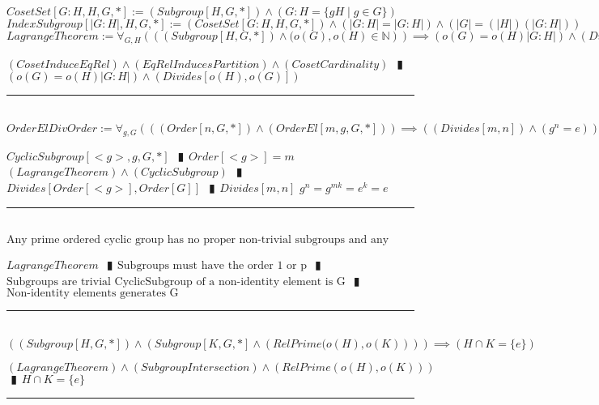 \documentclass{book}
\newcommand{\abr}{:=}
\newcommand{\pipe}{$\phantom{(}\vrectangleblack\phantom{)}$}
\newcommand{\pr}[1]{\left(#1\right)}
\newcommand{\st}{\mathbin{|}}
\begin{document}
$CosetSet[G : H, H, G, *] \abr (Subgroup[H, G, *]) \land (G : H = \{g H \st g \in G\})$ \\ %
$IndexSubgroup[|G : H|, H, G, *] \abr (CosetSet[G : H, H, G, *]) \land (|G : H| = |G : H|) \land \pr{|G| = (|H|) (|G : H|)}$ \\

$LagrangeTheorem \abr \forall_{G, H}\pr{\pr{(Subgroup[H, G, *]) \land (o(G), o(H) \in \mathbb{N}}} \implies \pr{o(G) = o(H) |G: H|} \land \pr{Divides[o(H), o(G)]}$
\begin{enumerate}
  \lit $(CosetInduceEqRel) \land (EqRelInducesPartition) \land (CosetCardinality)$ \pipe $\pr{o(G) = o(H) |G: H|} \land \pr{Divides[o(H), o(G)]}$
\end{enumerate} \vspace{.75mm} \hrule \vspace{.75mm} \ \\ 

$OrderElDivOrder \abr \forall_{g, G}\pr{\pr{(Order[n, G, *]) \land (OrderEl[m, g, G, *])} \implies \pr{(Divides[m, n]) \land (g^n = e)}}$
\begin{enumerate}
  \lit $CyclicSubgroup[<g>, g, G, *]$ \pipe $Order[<g>] = m$
  \lit $(LagrangeTheorem) \land (CyclicSubgroup)$ \pipe $Divides[Order[<g>], Order[G]]$ \pipe $Divides[m, n]$
  \lit $g^n = g^{m k} = e ^k = e$
\end{enumerate} \vspace{.75mm} \hrule \vspace{.75mm} \ \\ 

$\text{Any prime ordered cyclic group has no proper non-trivial subgroups and any non-identity element is a generator.}$
\begin{enumerate}
  \lit $LagrangeTheorem$ \pipe $\text{Subgroups must have the order 1 or p}$ \pipe $\text{Subgroups are trivial}$
  \lit $\text{CyclicSubgroup of a non-identity element is G}$ \pipe $\text{Non-identity elements generates G}$
\end{enumerate} \vspace{.75mm} \hrule \vspace{.75mm} \ \\ 

$\pr{(Subgroup[H, G, *]) \land \pr{Subgroup[K, G, *] \land \pr{RelPrime(o(H), o(K)}}} \implies (H \cap K = \{e\})$
\begin{enumerate}
  \lit $(LagrangeTheorem) \land (SubgroupIntersection) \land \pr{RelPrime\pr{o(H), o(K)}}$ \pipe $H \cap K = \{e\}$
\end{enumerate} \vspace{.75mm} \hrule \vspace{.75mm} \ \\ 
\end{document}
